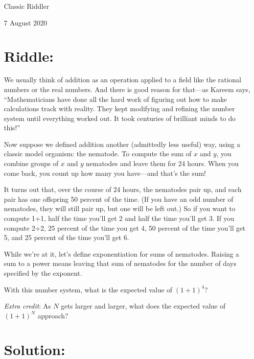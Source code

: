 \documentclass{article}
\begin{document}
\pagestyle{empty} %

\begin{center}
{\LARGE Classic Riddler}

\vspace{0.15in}

{\Large 7 August 2020}
\end{center}


\section*{Riddle:}

We usually think of addition as an operation applied to a field like the rational numbers or the real numbers.
And there is good reason for that---as Kareem says, ``Mathematicians have done all the hard work of figuring out how to make calculations track with reality.
They kept modifying and refining the number system until everything worked out.
It took centuries of brilliant minds to do this!''

Now suppose we defined addition another (admittedly less useful) way, using a classic model organism: the nematode.
To compute the sum of $x$ and $y$, you combine groups of $x$ and $y$ nematodes and leave them for 24 hours.
When you come back, you count up how many you have---and that's the sum!

It turns out that, over the course of 24 hours, the nematodes pair up, and each pair has one offspring 50 percent of the time.
(If you have an odd number of nematodes, they will still pair up, but one will be left out.)
So if you want to compute 1+1, half the time you'll get 2 and half the time you'll get 3.
If you compute 2+2, 25 percent of the time you get 4, 50 percent of the time you'll get 5, and 25 percent of the time you'll get 6.

While we're at it, let's define exponentiation for sums of nematodes.
Raising a sum to a power means leaving that sum of nematodes for the number of days specified by the exponent.

With this number system, what is the expected value of $(1+1)^{4}$?

\textit{Extra credit}: As $N$ gets larger and larger, what does the expected value of $(1+1)^{N}$ approach?

\section*{Solution:}
\end{document}
